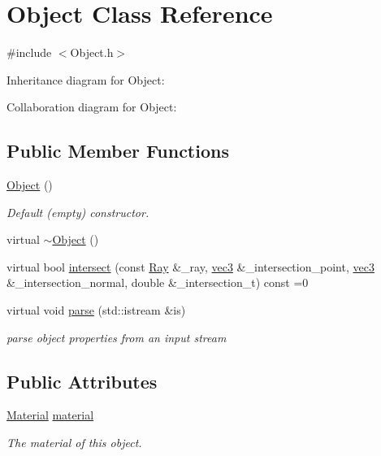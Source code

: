 \hypertarget{structObject}{}\section{Object Class Reference}
\label{structObject}


{\ttfamily \#include $<$Object.\+h$>$}



Inheritance diagram for Object\+:


Collaboration diagram for Object\+:
\subsection*{Public Member Functions}
\begin{DoxyCompactItemize}
\item 
\hyperlink{structObject_a40860402e64d8008fb42329df7097cdb}{Object} ()
\begin{DoxyCompactList}\small\item\em Default (empty) constructor. \end{DoxyCompactList}\item 
virtual \hyperlink{structObject_aa3e791419d84c4c346ef9499513b8e00}{$\sim$\+Object} ()
\item 
virtual bool \hyperlink{structObject_ac6549d30793a9b3da070234bf10c7e91}{intersect} (const \hyperlink{classRay}{Ray} \&\+\_\+ray, \hyperlink{classvec3}{vec3} \&\+\_\+intersection\+\_\+point, \hyperlink{classvec3}{vec3} \&\+\_\+intersection\+\_\+normal, double \&\+\_\+intersection\+\_\+t) const =0
\item 
virtual void \hyperlink{structObject_ae7828b080c96e2226f3dc19823161d41}{parse} (std\+::istream \&is)
\begin{DoxyCompactList}\small\item\em parse object properties from an input stream \end{DoxyCompactList}\end{DoxyCompactItemize}
\subsection*{Public Attributes}
\begin{DoxyCompactItemize}
\item 
\hyperlink{structMaterial}{Material} \hyperlink{structObject_a2f63d05a9a9264e1b6c388fa4bba4e91}{material}
\begin{DoxyCompactList}\small\item\em The material of this object. \end{DoxyCompactList}\end{DoxyCompactItemize}
